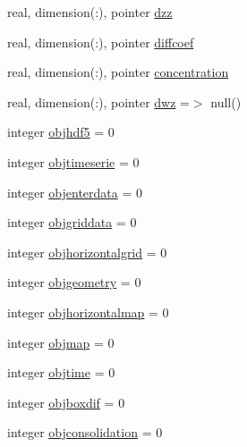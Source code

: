 \begin{DoxyCompactItemize}
real, dimension(\+:), pointer \mbox{\hyperlink{structmodulesedimentproperties_1_1t__sedimentproperties_a061164d4b6b0f60f8bef20f14e2ec0a6}{dzz}}
\item 
real, dimension(\+:), pointer \mbox{\hyperlink{structmodulesedimentproperties_1_1t__sedimentproperties_ac821aa1267aa636cdd225fd5ca4788e4}{diffcoef}}
\item 
real, dimension(\+:), pointer \mbox{\hyperlink{structmodulesedimentproperties_1_1t__sedimentproperties_a5ef592f14f063934b896ad065cfbf374}{concentration}}
\item 
real, dimension(\+:), pointer \mbox{\hyperlink{structmodulesedimentproperties_1_1t__sedimentproperties_a5ae97edf51e74ae02c50e3b1821393a5}{dwz}} =$>$ null()
\item 
integer \mbox{\hyperlink{structmodulesedimentproperties_1_1t__sedimentproperties_a02b8f0033d9802c4ee797123d8a4f08d}{objhdf5}} = 0
\item 
integer \mbox{\hyperlink{structmodulesedimentproperties_1_1t__sedimentproperties_a78d2834697da1bddd39c1032c7cfc399}{objtimeserie}} = 0
\item 
integer \mbox{\hyperlink{structmodulesedimentproperties_1_1t__sedimentproperties_ae8136215558d6c141b1318ebfc5913fd}{objenterdata}} = 0
\item 
integer \mbox{\hyperlink{structmodulesedimentproperties_1_1t__sedimentproperties_a580de596d7e97446cad99b766688e095}{objgriddata}} = 0
\item 
integer \mbox{\hyperlink{structmodulesedimentproperties_1_1t__sedimentproperties_a4486249689662cf305935970a0965401}{objhorizontalgrid}} = 0
\item 
integer \mbox{\hyperlink{structmodulesedimentproperties_1_1t__sedimentproperties_a9e1a79e5977fc6c644429517c40bd1a3}{objgeometry}} = 0
\item 
integer \mbox{\hyperlink{structmodulesedimentproperties_1_1t__sedimentproperties_a0144d2d71ef7c47bed6a855b72761815}{objhorizontalmap}} = 0
\item 
integer \mbox{\hyperlink{structmodulesedimentproperties_1_1t__sedimentproperties_a7c8627382c99f0c56e866372ee455455}{objmap}} = 0
\item 
integer \mbox{\hyperlink{structmodulesedimentproperties_1_1t__sedimentproperties_a23853c37fa0c4faad26fc6feae11c85d}{objtime}} = 0
\item 
integer \mbox{\hyperlink{structmodulesedimentproperties_1_1t__sedimentproperties_a5aec696defaf9396ca4ca2fe91e2a2ec}{objboxdif}} = 0
\item 
integer \mbox{\hyperlink{structmodulesedimentproperties_1_1t__sedimentproperties_ac97e2056c9fab57e325f1fdd1304d36a}{objconsolidation}} = 0

\end{DoxyCompactItemize}
